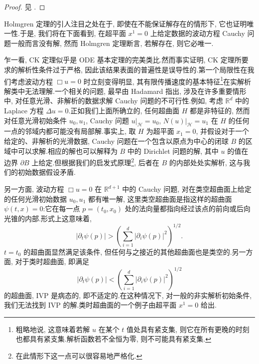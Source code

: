 \begin{proof}
见 \cite{j}.
\end{proof}

\begin{remark*}
Holmgren 定理的引人注目之处在于, 即使在不能保证解存在的情形下, 它也证明唯一性.于是, 我们将在下面看到, 在超平面 $x^{1} = 0$ 上给定数据的波动方程 Cauchy 问题一般而言没有解, 然而 Holmgren 定理断言, 若解存在, 则它必唯一.
\end{remark*}

乍一看, CK 定理似乎是 ODE 基本定理的完美类比.然而事实证明, CK 定理所要求的解析性条件过于严格, 因此该结果表面的普遍性是误导性的.第一个局限性在我们考虑波动方程 $\Box u = 0$ 时立刻变得明显, 其有限传播速度的基本特征\footnote{粗略地说, 这意味着若解 $u$ 在某个 $t$ 值处具有紧支集, 则它在所有更晚的时刻也都具有紧支集.解析函数若不全恒为零, 则不可能具有紧支集.}在实解析解类中无法理解.一个相关的问题, 最早由 Hadamard 指出, 涉及在许多重要情形中, 对任意光滑、非解析的数据求解 Cauchy 问题的不可行性.例如, 考虑 $\mathbb{R}^{d}$ 中的 Laplace 方程 $\Delta u = 0$.正如我们上面所确立的, 任何超曲面 $H$ 都是非特征的, 然而对任意光滑初始条件 $u_{0}, u_{1}$, Cauchy 问题 $u|_{\mathcal{H}} = u_{0}$, $N(u)|_{\mathcal{H}} = u_{1}$ 在 $H$ 的任何一点的邻域内都可能没有局部解.事实上, 取 $H$ 为超平面 $x_{1} = 0$, 并假设对于一个给定的、非解析的光滑数据, Cauchy 问题在一个包含以原点为中心的闭球 $B$ 的区域中可以求解.相应的解也可以解释为 $B$ 中的 Dirichlet 问题的解, 其中 $u$ 的值在边界 $\partial B$ 上给定.但根据我们的启发式原理\footnote{在此情形下这一点可以很容易地严格化.}, 后者在 $B$ 的内部处处实解析, 这与我们的初始数据假设矛盾.

另一方面, 波动方程 $\Box u = 0$ 在 $\mathbb{R}^{d+1}$ 中的 Cauchy 问题, 对在类空超曲面上给定的任何光滑初始数据 $u_{0}, u_{1}$ 都有唯一解, 这里类空超曲面是指这样的超曲面 $\psi(t, x) = 0$:它在每一点 $p = (t_{0}, x_{0})$ 处的法向量都指向经过该点的前向或后向光锥的内部.形式上这意味着,
\begin{equation}
|\partial_{t} \psi(p)| > \left(\sum_{i = 1}^{d} |\partial_{i} \psi(p)|^{2}\right)^{1/2}. \label{eq:c2-125}
\end{equation}
$t = t_{0}$ 的超曲面显然满足该条件, 但任何与之接近的其他超曲面也是类空的.另一方面, 对于类时超曲面, 即满足
\begin{equation}
|\partial_{t} \psi(p)| < \left(\sum_{i = 1}^{d} |\partial_{i} \psi(p)|^{2}\right)^{1/2} \label{eq:c2-126}
\end{equation}
的超曲面, IVP 是病态的, 即不适定的.在这种情况下, 对一般的非实解析初始条件, 我们无法找到 IVP 的解.类时超曲面的一个例子由超平面 $x^{1} = 0$ 给出.

